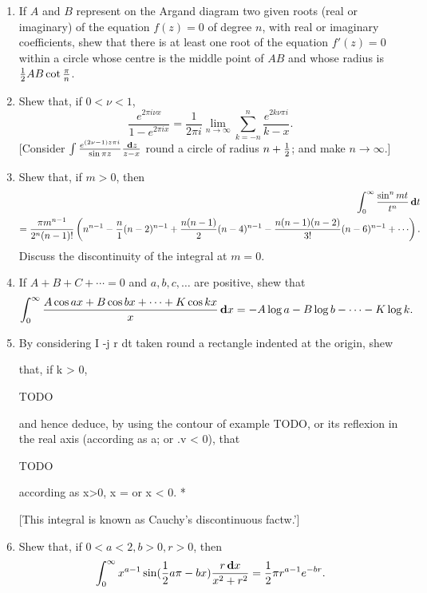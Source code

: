 \begin{enumerate}
\item 
  If $A$ and $B$ represent on the Argand diagram two given roots (real
  or imaginary) of the equation $f(z) = 0$ of degree $n$, with real or
  imaginary coefficients, shew that there is at least one root of the
  equation $f'(z) = 0$ within a circle whose centre is the middle point
  of $AB$ and whose radius is $\frac{1}{2} AB \cot \frac{\pi}{n}$. 
\item
  Shew that, if $0<\nu<1$,
  $$
  \frac{e^{2\pi i \nu x}}{1 - e^{2\pi i x}}
  =
  \frac{1}{2\pi i}
  \lim_{n\rightarrow\infty}
  \sum_{k=-n}^{n} \frac{e^{2k\nu\pi i}}{k-x}.
  $$
  [Consider
  $
  \int \frac{e^{(2\nu-1) z \pi i}}{\sin \pi z}
  \frac{\, \mathbf{d} z}{z-x}
  $
  round a circle of radius $n+\frac{1}{2}$; and make $n\rightarrow\infty$.]
\item
  Shew that, if $m > 0$, then
  \begin{align*}
    \int_{0}^{\infty}
    \frac{\sin^{n} mt}{t^{n}} \dmeasure t
    \\
    =
    \frac{\pi m^{n-1}}{2^{n} (n-1)!}
    \theparen{
      n^{n-1}
      -
      \frac{n}{1} (n-2)^{n-1}
      +
      \frac{n(n-1)}{2} (n-4)^{n-1}
      -
      \frac{n(n-1)(n-2)}{3!} (n-6)^{n-1}
      +
      \cdots
    }.
  \end{align*}
  Discuss the discontinuity of the integral at $m = 0$.

\item
  If $A + B + C + \cdots = 0$ and $a, b, c, \ldots$ are positive, shew that
  $$
  \int_{0}^{\infty}
  \frac{A \cos ax + B \cos bx + \cdots + K \cos kx}{x}
  \, \mathbf{d} x
  =
  -A \log a
  -B \log b
  - \cdots
  -K \log k.
  $$
\item
  By considering I -j r dt taken round a rectangle indented at the
  origin, shew

  that, if k > 0,

  TODO

  and hence deduce, by using the contour of  example TODO, or its
  reflexion in the real axis (according as a; or .v < 0), that

  TODO

  according as x>0, x = or x < 0. *

  [This integral is known as Cauchy's discontinuous factw.']
%
\item
  Shew that, if $0 < a < 2, b > 0, r > 0$, then
  $$
  \int_{0}^{\infty}
  x^{a-1}
  \sin (\frac{1}{2} a\pi - bx )
  \frac{r \, \mathbf{d} x}{x^{2} + r^{2}}
  =
  \frac{1}{2} \pi r^{a-1} e^{-br}.
  $$
%
%


\end{enumerate}
